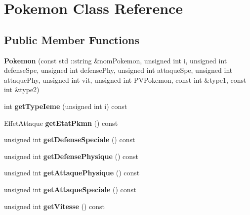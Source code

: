\hypertarget{class_pokemon}{}\section{Pokemon Class Reference}
\label{class_pokemon}
\subsection*{Public Member Functions}
\begin{DoxyCompactItemize}
\item 
\mbox{\label{class_pokemon_a29848dd8e04d070a2927b9beeca8d47c}} 
{\bfseries Pokemon} (const std \+::string \&nom\+Pokemon, unsigned int i, unsigned int defense\+Spe, unsigned int defense\+Phy, unsigned int attaque\+Spe, unsigned int attaque\+Phy, unsigned int vit, unsigned int P\+V\+Pokemon, const int \&type1, const int \&type2)
\item 
\mbox{\label{class_pokemon_a3d9cc7fe1b38d8d8ea3ef499116c0eac}} 
int {\bfseries get\+Type\+Ieme} (unsigned int i) const
\item 
\mbox{\label{class_pokemon_a79295a5febcfa6a9709ed7f1bb7e3a18}} 
Effet\+Attaque {\bfseries get\+Etat\+Pkmn} () const
\item 
\mbox{\label{class_pokemon_a5f932295f014353aeead20e0225b6eee}} 
unsigned int {\bfseries get\+Defense\+Speciale} () const
\item 
\mbox{\label{class_pokemon_a90e8c3b16d39995fcbcfd01834f57be7}} 
unsigned int {\bfseries get\+Defense\+Physique} () const
\item 
\mbox{\label{class_pokemon_a27ae3d139d0c958b2f605743eb8f8a6d}} 
unsigned int {\bfseries get\+Attaque\+Physique} () const
\item 
\mbox{\label{class_pokemon_ace1c2940d8870b907cc2b0cd29f6efba}} 
unsigned int {\bfseries get\+Attaque\+Speciale} () const
\item 
\mbox{\label{class_pokemon_a04a02b9ee3a43d25596b6d934ef861ba}} 
unsigned int {\bfseries get\+Vitesse} () const
\item 

\end{DoxyCompactItemize}
